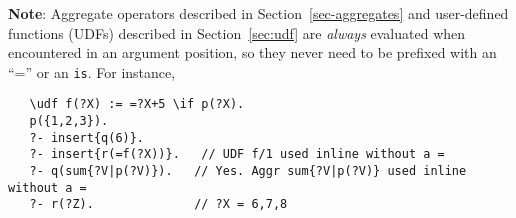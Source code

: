 \noindent
\textbf{Note}:  Aggregate operators described in
Section~\ref{sec-aggregates} and user-defined functions (UDFs) described in
Section~\ref{sec:udf} are \emph{always} evaluated when encountered in an
argument position, so they never need to be prefixed with an ``='' or an
\texttt{\bs{}is}. For instance,
\begin{verbatim}
   \udf f(?X) := =?X+5 \if p(?X).
   p({1,2,3}).
   ?- insert{q(6)}.
   ?- insert{r(=f(?X))}.   // UDF f/1 used inline without a =
   ?- q(sum{?V|p(?V)}).   // Yes. Aggr sum{?V|p(?V)} used inline without a =
   ?- r(?Z).              // ?X = 6,7,8
\end{verbatim}

